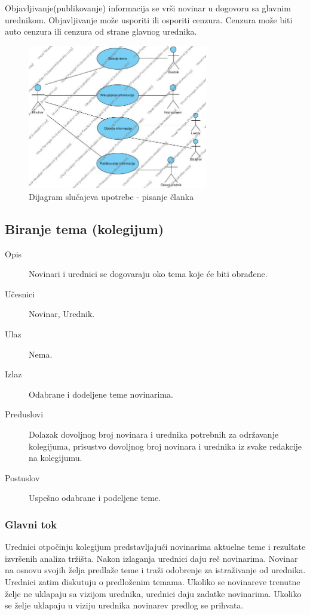 Objavljivanje(publikovanje) informacija se vrši novinar u dogovoru sa glavnim u\-red\-ni\-kom. Objavljivanje može usporiti ili osporiti cenzura. Cenzura može biti auto cenzura ili cenzura od strane glavnog urednika. \\


\begin{figure}[hbtp]
    \centering
    \includegraphics[width=0.7\textwidth]{slike/pisanje}
    \caption{Dijagram slučajeva upotrebe - pisanje članka}
    \label{pisanje}
\end{figure}

\subsection{Biranje tema (kolegijum)}

\begin{description}
\item [Opis] Novinari i urednici se dogovaraju oko tema koje će biti obrađene.
\item [Učesnici] Novinar, Urednik.
\item [Ulaz] Nema.
\item [Izlaz] Odabrane i dodeljene teme novinarima.
\item [Preduslovi] Dolazak dovoljnog broj novinara i urednika potrebnih za održavanje kolegijuma, prisustvo dovoljnog broj  novinara i urednika iz svake redakcije na kolegijumu.
\item [Postuslov] Uspešno odabrane i podeljene teme.
\end{description}      

\subsubsection{Glavni tok}
Urednici otpočinju kolegijum predstavljajući novinarima aktuelne teme i rezultate izvršenih analiza tržišta. Nakon izlaganja urednici daju reč novinarima. Novinar na osnovu svojih želja predlaže teme i traži odobrenje za istraživanje od urednika. Urednici zatim diskutuju o predloženim temama. Ukoliko se novinareve trenutne želje ne uklapaju sa vizijom urednika, urednici daju zadatke novinarima. Ukoliko se želje uklapaju u viziju urednika novinarev predlog se prihvata.
